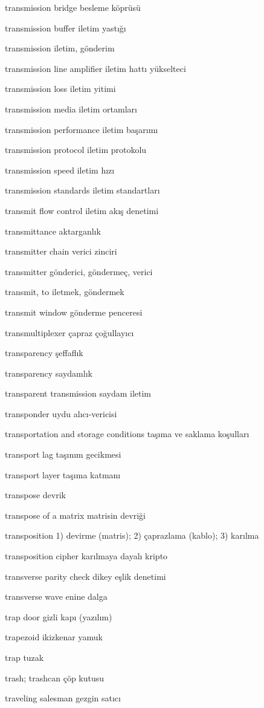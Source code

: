 \documentclass[12pt,fleqn]{article}\usepackage{../../common}
\begin{document}
transmission bridge besleme köprüsü

transmission buffer iletim yastığı

transmission iletim, gönderim

transmission line amplifier iletim hattı yükselteci

transmission loss iletim yitimi

transmission media iletim ortamları

transmission performance iletim başarımı

transmission protocol iletim protokolu

transmission speed iletim hızı

transmission standards iletim standartları

transmit flow control iletim akış denetimi

transmittance aktarganlık

transmitter chain verici zinciri

transmitter gönderici, göndermeç, verici

transmit, to iletmek, göndermek

transmit window gönderme penceresi

transmultiplexer çapraz çoğullayıcı

transparency şeffaflık

transparency saydamlık

transparent transmission saydam iletim

transponder uydu alıcı-vericisi

transportation and storage conditions taşıma ve saklama koşulları

transport lag taşınım gecikmesi

transport layer taşıma katmanı

transpose devrik

transpose of a matrix matrisin devriği

transposition 1) devirme (matris); 2) çaprazlama (kablo); 3) karılma

transposition cipher karılmaya dayalı kripto

transverse parity check dikey eşlik denetimi

transverse wave enine dalga

trap door gizli kapı (yazılım)

trapezoid ikizkenar yamuk

trap tuzak

trash; trashcan çöp kutusu

traveling salesman gezgin satıcı
\end{document}

